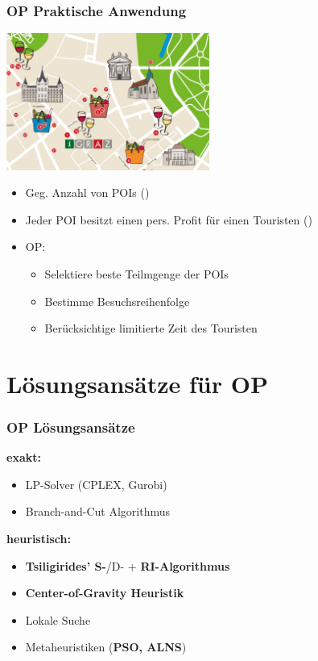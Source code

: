 \documentclass{beamer}
\begin{document}
\begin{frame}
  \frametitle{OP Praktische Anwendung}
  \centering
  \includegraphics[width=0.5\textwidth]{img/POI.png}
  \begin{itemize}
    \item Geg. Anzahl von POIs ()
    \item Jeder POI besitzt einen pers. Profit für einen Touristen ()
    \item OP:
    \begin{itemize}
      \item Selektiere beste Teilmgenge der POIs
      \item Bestimme Besuchsreihenfolge
      \item Berücksichtige limitierte Zeit des Touristen
    \end{itemize}
  \end{itemize}
\end{frame}

\section{Lösungsansätze für \textsc{OP}}

\begin{frame}
  \frametitle{OP Lösungsansätze}
  \textbf{exakt:}
  \begin{itemize}
    \item LP-Solver (CPLEX, Gurobi)
    \item Branch-and-Cut Algorithmus
  \end{itemize}
  \textbf{heuristisch:}
  \begin{itemize}
    \item \textbf{Tsiligirides' S-}/D- + \textbf{RI-Algorithmus}
    \item \textbf{Center-of-Gravity Heuristik}
    \item Lokale Suche
    \item Metaheuristiken (\textbf{PSO, ALNS})
  \end{itemize}
\end{frame}
\end{document}
